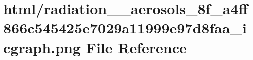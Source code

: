 \hypertarget{radiation____aerosols__8f__a4ff866c545425e7029a11999e97d8faa__icgraph_8png}{}\section{html/radiation\+\_\+\+\_\+aerosols\+\_\+8f\+\_\+a4ff866c545425e7029a11999e97d8faa\+\_\+icgraph.png File Reference}
\label{radiation____aerosols__8f__a4ff866c545425e7029a11999e97d8faa__icgraph_8png}
